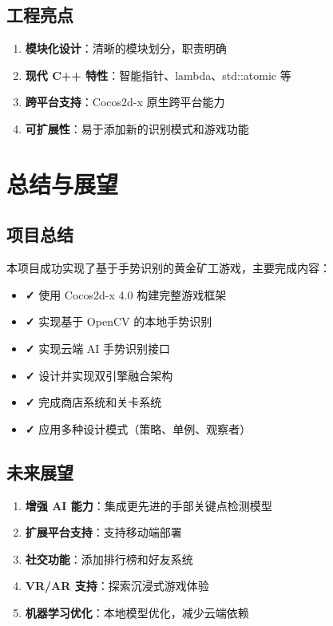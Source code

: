 \documentclass{article}
\begin{document}
\subsection{工程亮点}

\begin{enumerate}[leftmargin=*]
    \item \textbf{模块化设计}：清晰的模块划分，职责明确
    \item \textbf{现代 C++ 特性}：智能指针、lambda、std::atomic 等
    \item \textbf{跨平台支持}：Cocos2d-x 原生跨平台能力
    \item \textbf{可扩展性}：易于添加新的识别模式和游戏功能
\end{enumerate}

\newpage

\section{总结与展望}

\subsection{项目总结}

本项目成功实现了基于手势识别的黄金矿工游戏，主要完成内容：

\begin{itemize}[leftmargin=*]
    \item \textbf{✓} 使用 Cocos2d-x 4.0 构建完整游戏框架
    \item \textbf{✓} 实现基于 OpenCV 的本地手势识别
    \item \textbf{✓} 实现云端 AI 手势识别接口
    \item \textbf{✓} 设计并实现双引擎融合架构
    \item \textbf{✓} 完成商店系统和关卡系统
    \item \textbf{✓} 应用多种设计模式（策略、单例、观察者）
\end{itemize}

\subsection{未来展望}

\begin{enumerate}[leftmargin=*]
    \item \textbf{增强 AI 能力}：集成更先进的手部关键点检测模型
    \item \textbf{扩展平台支持}：支持移动端部署
    \item \textbf{社交功能}：添加排行榜和好友系统
    \item \textbf{VR/AR 支持}：探索沉浸式游戏体验
    \item \textbf{机器学习优化}：本地模型优化，减少云端依赖
\end{enumerate}
\end{document}
